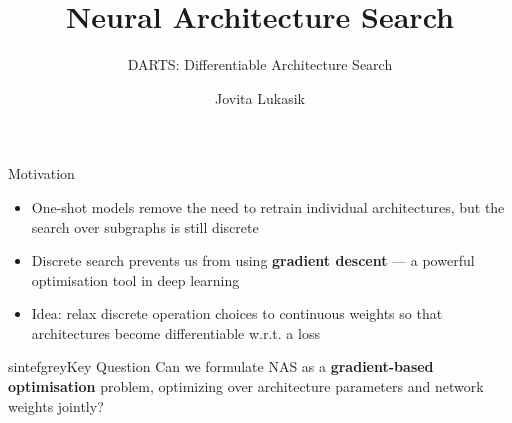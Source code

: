 \documentclass[main]{subfiles}
\title[AutoML: NAS]{Neural Architecture Search}
\subtitle{DARTS: Differentiable Architecture Search}
\author[Jovita Lukasik]{Jovita Lukasik}
\date{}
\begin{document}
	\maketitle

\begin{frame}{Motivation}
\begin{itemize}
    \item One-shot models remove the need to retrain individual architectures, but the \alert{search over subgraphs is still discrete}
    \item Discrete search prevents us from using \textbf{gradient descent} — a powerful optimisation tool in deep learning
    \item Idea: relax discrete operation choices to \alert{continuous weights} so that architectures become differentiable w.r.t. a loss
\end{itemize}
\pause
\vspace{0.5em}
\begin{colorblock}[black]{sintefgrey}{Key Question}
Can we formulate NAS as a \textbf{gradient-based optimisation} problem, optimizing over architecture parameters and network weights jointly?
\end{colorblock}
\end{frame}
    
\end{document}

